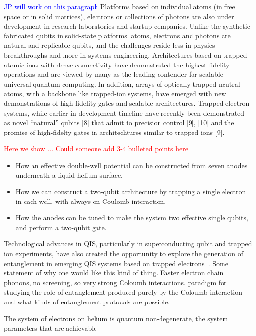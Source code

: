 \documentclass[twocolumn,superscriptaddress,unsortedaddress,
 amsmath,amssymb,
 aps,
]{revtex4-2}
\begin{document}
\textcolor{blue}{JP will work on this paragraph}
Platforms based on individual atoms (in free space or in solid matrices), electrons or collections of photons are also under development in research laboratories and startup companies. Unlike the synthetic fabricated qubits in solid-state platforms, atoms, electrons and photons are natural and replicable qubits, and the challenges reside less in physics breakthroughs and more in systems engineering.  Architectures based on trapped atomic ions with dense connectivity have demonstrated the highest fidelity operations and are viewed by many as the leading contender for scalable universal quantum computing.  In addition, arrays of optically trapped neutral atoms, with a backbone like trapped-ion systems, have emerged with new demonstrations of high-fidelity gates and scalable architectures.  Trapped electron systems, while earlier in development timeline have recently been demonstrated as novel “natural” qubits [8] that admit to precision control [9], [10] and the promise of high-fidelty gates in architechtures similar to trapped ions [9].

\textcolor{red}{{Here we show ... Could someone add 3-4 bulleted points here}}
\begin{itemize}
    \item How an effective double-well potential can be constructed from seven
        anodes underneath a liquid helium surface.
    \item How we can construct a two-qubit architecture by trapping a single
        electron in each well, with always-on Coulomb interaction.
    \item How the anodes can be tuned to make the system two effective single
        qubits, and perform a two-qubit gate.
\end{itemize}


Technological advances in QIS, particularly in superconducting qubit and trapped ion experiments, have also created the opportunity to explore the generation of entanglement in emerging QIS systems based on trapped electrons~{}. Some statement of why one would like this kind of thing. Faster electron chain phonons, no screening, so very strong Coloumb interactions. paradigm for studying the role of entanglement produced purely by the Coloumb interaction and what kinds of entanglement protocols are possible.

The system of electrons on helium is quantum non-degenerate, the system parameters that are achievable 
\end{document}
